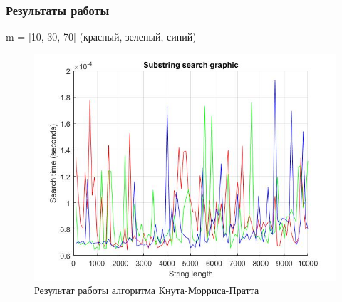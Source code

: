 \documentclass[12pt]{article}
\begin{document}
\subsubsection{Результаты работы}
m = [10, 30, 70] (красный, зеленый, синий)
\begin{figure}[h]
	\centering
	\includegraphics[width=0.8\linewidth]{KMP.jpg}
	\caption{Результат работы алгоритма Кнута-Морриса-Пратта}
\end{figure}
\vfill
\end{document}
